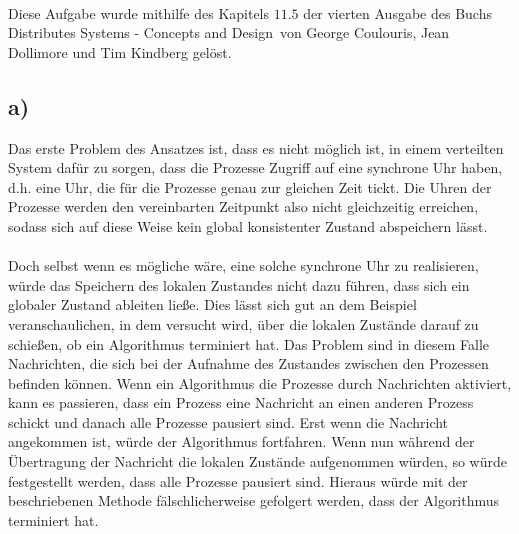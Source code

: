\documentclass[ngerman]{fbi-aufgabenblatt}
\begin{document}
\setcounter{section}{3}
 \\
Diese Aufgabe wurde mithilfe des Kapitels $11.5$ der vierten Ausgabe des Buchs \glqq Distributes Systems - Concepts and Design\grqq\ von George Coulouris, Jean Dollimore und Tim Kindberg gelöst.

\subsection*{a)}
Das erste Problem des Ansatzes ist, dass es nicht möglich ist, in einem verteilten System dafür zu sorgen, dass die Prozesse Zugriff auf eine synchrone Uhr haben, d.h. eine Uhr, die für die Prozesse genau zur gleichen Zeit tickt. Die Uhren der Prozesse werden den vereinbarten Zeitpunkt also nicht gleichzeitig erreichen, sodass sich auf diese Weise kein global konsistenter Zustand abspeichern lässt. \\
\\
Doch selbst wenn es mögliche wäre, eine solche synchrone Uhr zu realisieren, würde das Speichern des lokalen Zustandes nicht dazu führen, dass sich ein globaler Zustand ableiten ließe. Dies lässt sich gut an dem Beispiel veranschaulichen, in dem versucht wird, über die lokalen Zustände darauf zu schießen, ob ein Algorithmus terminiert hat. Das Problem sind in diesem Falle Nachrichten, die sich bei der Aufnahme des Zustandes zwischen den Prozessen befinden können. Wenn ein Algorithmus die Prozesse durch Nachrichten aktiviert, kann es passieren, dass ein Prozess eine Nachricht an einen anderen Prozess schickt und danach alle Prozesse pausiert sind. Erst wenn die Nachricht angekommen ist, würde der Algorithmus fortfahren. Wenn nun während der Übertragung der Nachricht die lokalen Zustände aufgenommen würden, so würde festgestellt werden, dass alle Prozesse pausiert sind. Hieraus würde mit der beschriebenen Methode fälschlicherweise gefolgert werden, dass der Algorithmus terminiert hat.
\end{document}
